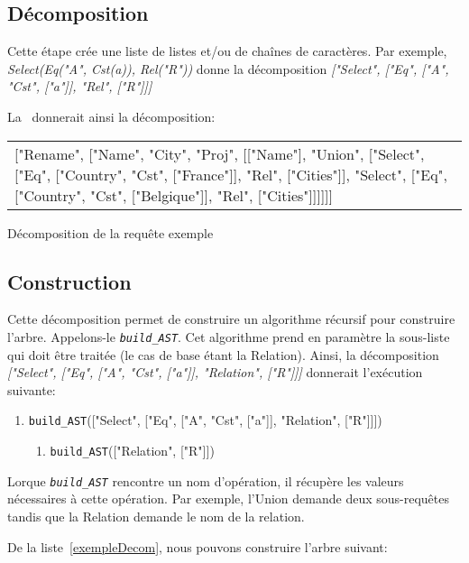 \documentclass[]{article}
\begin{document}
\subsection{D\'ecomposition}
Cette \'etape cr\'ee une liste de listes et/ou de cha\^ines de caract\`eres. Par exemple, \textit{Select(Eq("A", Cst(a)), Rel("R"))} donne la d\'ecomposition \textit{["Select", ["Eq", ["A", "Cst", ["a"]], "Rel", ["R"]]]}

La~ donnerait ainsi la d\'ecomposition:

\begin{decomposition}[H]
	\centering
	\begin{tabular}{p{250px}}
		["Rename", ["Name", "City", "Proj", [["Name"], "Union", ["Select", ["Eq", ["Country", "Cst", ["France"]], "Rel", ["Cities"]], "Select", ["Eq", ["Country", "Cst", ["Belgique"]], "Rel", ["Cities"]]]]]]
	\end{tabular}
	\caption{D\'ecomposition de la requ\^ete exemple}
	\label{exempleDecom}
\end{decomposition}

\subsection{Construction}

Cette d\'ecomposition permet de construire un algorithme r\'ecursif pour construire l'arbre. Appelons-le \textit{\texttt{build\_AST}}. Cet algorithme prend en param\`etre la sous-liste qui doit \^etre trait\'ee (le cas de base \'etant la Relation). Ainsi, la d\'ecomposition \textit{["Select", ["Eq", ["A", "Cst", ["a"]], "Relation", ["R"]]]} donnerait l'ex\'ecution suivante:

\begin{enumerate}
	\item \texttt{build\_AST}(["Select", ["Eq", ["A", "Cst", ["a"]], "Relation", ["R"]]])
        \begin{enumerate}
			\item \texttt{build\_AST}(["Relation", ["R"]])
        \end{enumerate}
\end{enumerate}

Lorque \textit{\texttt{build\_AST}} rencontre un nom d'op\'eration, il r\'ecup\`ere les valeurs n\'ecessaires \`a cette op\'eration. Par exemple, l'Union demande deux sous-requ\^etes tandis que la Relation demande le nom de la relation.

De la liste~\ref{exempleDecom}, nous pouvons construire l'arbre suivant:
\end{document}
